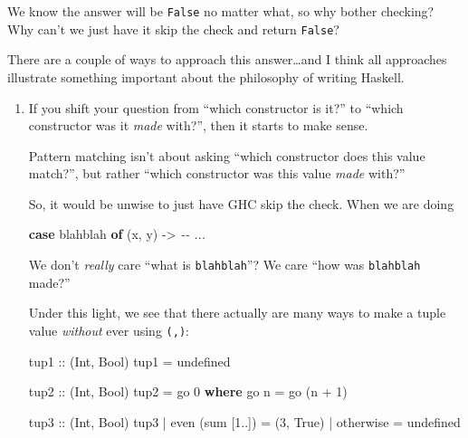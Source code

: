 \documentclass[]{article}
\newenvironment{Shaded}{}{}
\newcommand{\CommentTok}[1]{\textcolor[rgb]{0.38,0.63,0.69}{\textit{#1}}}
\newcommand{\DataTypeTok}[1]{\textcolor[rgb]{0.56,0.13,0.00}{#1}}
\newcommand{\DecValTok}[1]{\textcolor[rgb]{0.25,0.63,0.44}{#1}}
\newcommand{\FunctionTok}[1]{\textcolor[rgb]{0.02,0.16,0.49}{#1}}
\newcommand{\KeywordTok}[1]{\textcolor[rgb]{0.00,0.44,0.13}{\textbf{#1}}}
\newcommand{\NormalTok}[1]{#1}
\newcommand{\OperatorTok}[1]{\textcolor[rgb]{0.40,0.40,0.40}{#1}}
\newcommand{\OtherTok}[1]{\textcolor[rgb]{0.00,0.44,0.13}{#1}}
\begin{document}
We know the answer will be \texttt{False} no matter what, so why bother
checking? Why can't we just have it skip the check and return \texttt{False}?

There are a couple of ways to approach this answer\ldots and I think all
approaches illustrate something important about the philosophy of writing
Haskell.

\begin{enumerate}
\def\labelenumi{\arabic{enumi}.}
\item
  If you shift your question from ``which constructor is it?'' to ``which
  constructor was it \emph{made} with?'', then it starts to make sense.

  Pattern matching isn't about asking ``which constructor does this value
  match?'', but rather ``which constructor was this value \emph{made} with?''

  So, it would be unwise to just have GHC skip the check. When we are doing

\begin{Shaded}
\begin{Highlighting}[]
\KeywordTok{case}\NormalTok{ blahblah }\KeywordTok{of}
\NormalTok{  (x, y) }\OtherTok{{-}>} \CommentTok{{-}{-} ...}
\end{Highlighting}
\end{Shaded}

  We don't \emph{really} care ``what is \texttt{blahblah}''? We care ``how was
  \texttt{blahblah} made?''

  Under this light, we see that there actually are many ways to make a tuple
  value \emph{without} ever using \texttt{(,)}:

\begin{Shaded}
\begin{Highlighting}[]
\OtherTok{tup1 ::}\NormalTok{ (}\DataTypeTok{Int}\NormalTok{, }\DataTypeTok{Bool}\NormalTok{)}
\NormalTok{tup1 }\OtherTok{=} \FunctionTok{undefined}

\OtherTok{tup2 ::}\NormalTok{ (}\DataTypeTok{Int}\NormalTok{, }\DataTypeTok{Bool}\NormalTok{)}
\NormalTok{tup2 }\OtherTok{=}\NormalTok{ go }\DecValTok{0}
  \KeywordTok{where}
\NormalTok{    go n }\OtherTok{=}\NormalTok{ go (n }\OperatorTok{+} \DecValTok{1}\NormalTok{)}

\OtherTok{tup3 ::}\NormalTok{ (}\DataTypeTok{Int}\NormalTok{, }\DataTypeTok{Bool}\NormalTok{)}
\NormalTok{tup3}
  \OperatorTok{|} \FunctionTok{even}\NormalTok{ (}\FunctionTok{sum}\NormalTok{ [}\DecValTok{1}\OperatorTok{..}\NormalTok{]) }\OtherTok{=}\NormalTok{ (}\DecValTok{3}\NormalTok{, }\DataTypeTok{True}\NormalTok{)}
  \OperatorTok{|} \FunctionTok{otherwise}        \OtherTok{=} \FunctionTok{undefined}
\end{Highlighting}
\end{Shaded}


\end{enumerate}
\end{document}
